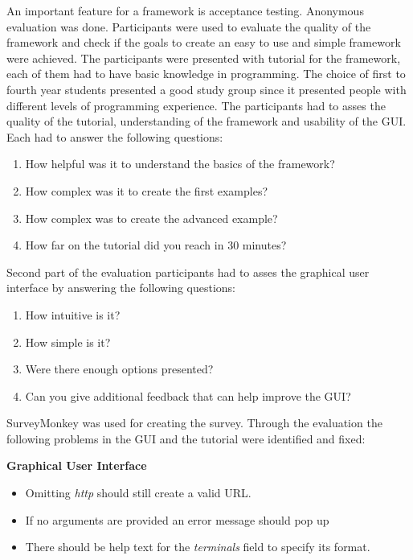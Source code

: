 An important feature for a framework is acceptance testing. Anonymous evaluation was done. Participants were used to evaluate the quality of the framework and check if the goals
to create an easy to use and simple framework were achieved. The participants were presented with tutorial\cite{tut} for the framework, 
each of them had to have basic knowledge in programming. The choice of first to fourth year students presented a good study group since it presented people
with different levels of programming experience. The participants had to asses the quality of the 
tutorial, understanding of the framework and usability of the GUI. Each had to answer the following questions\cite{monkey}:

\begin{enumerate}
\item How helpful was it to understand the basics of the framework?
\item How complex was it to create the first examples?
\item How complex was to create the advanced example?
\item How far on the tutorial did you reach in 30 minutes?
\end{enumerate}
 
Second part of the evaluation participants had to asses the graphical user interface by answering the following questions: 

\begin{enumerate}
\item How intuitive is it?
\item How simple is it?
\item Were there enough options presented?
\item Can you give additional feedback that can help improve the GUI?
\end{enumerate}

SurveyMonkey was used for creating the survey. Through the evaluation the following problems in the GUI and the tutorial were identified and fixed:

\textbf{Graphical User Interface}
\begin{itemize}
\item Omitting \textit{http} should still create a valid URL.
\item If no arguments are provided an error message should pop up
\item There should be help text for the \textit{terminals} field to specify its format.
\end{itemize}

